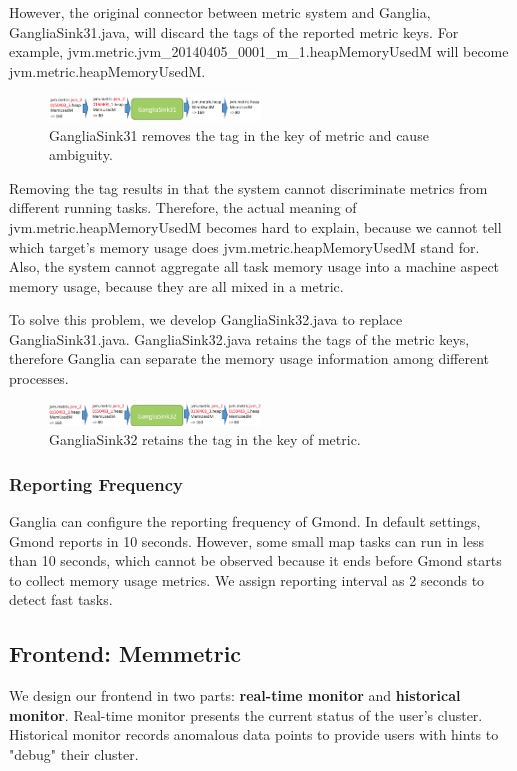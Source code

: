 However, the original connector between metric system and Ganglia, GangliaSink31.java, will discard the tags of the reported metric keys. For example, jvm.metric.jvm\_20140405\_0001\_m\_1.heapMemoryUsedM will become jvm.metric.heapMemoryUsedM. 

\begin{figure}[h!]
  \centering
    \includegraphics[width=0.5\textwidth]{image/ganglia31_flow.png}
  \caption{GangliaSink31 removes the tag in the key of metric and cause ambiguity.}
\end{figure}

Removing the tag results in that the system cannot discriminate metrics from different running tasks. Therefore, the actual meaning of jvm.metric.heapMemoryUsedM becomes hard to explain, because we cannot tell which target's memory usage does jvm.metric.heapMemoryUsedM stand for. Also, the system cannot aggregate all task memory usage into a machine aspect memory usage, because they are all mixed in a metric. 

To solve this problem, we develop GangliaSink32.java to replace GangliaSink31.java. GangliaSink32.java retains the tags of the metric keys, therefore Ganglia can separate the memory usage information among different processes. 

\begin{figure}[h!]
  \centering
  \includegraphics[width=0.5\textwidth]{image/ganglia32_flow.png}
  \caption{GangliaSink32 retains the tag in the key of metric.}
\end{figure}

\subsubsection{Reporting Frequency}

Ganglia can configure the reporting frequency of Gmond.  In default settings, Gmond reports in 10 seconds. However, some small map tasks can run in less than 10 seconds, which cannot be observed because it ends before Gmond starts to collect memory usage metrics. 
We assign reporting interval as 2 seconds to detect fast tasks.

\subsection{Frontend: Memmetric}
We design our frontend in two parts: \textbf{real-time monitor} and \textbf{historical monitor}. Real-time monitor presents the current status of the user's cluster. Historical monitor records anomalous data points to provide users with hints to "debug" their cluster.

